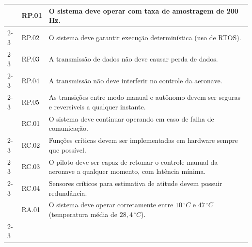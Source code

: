 \begin{table}[H]
{\begin{tabular}{|l|l|l|}
                                                                 & RP.01                                                               & O sistema deve operar com taxa de amostragem  de 200 Hz.                \\ \cline{2-3} 
                                                                 & RP.02                                                               & O sistema deve garantir execução determinística (uso de RTOS).                \\ \cline{2-3} 
                                                                 & RP.03                                                               & A transmissão de dados não deve causar perda de dados.                        \\ \cline{2-3} 
                                                                 & RP.04                                                               & A transmissão não deve interferir no controle da aeronave.                    \\ \cline{2-3}
\multirow{-5}{*}{Performance}                                    & RP.05                                                               & As transições entre modo manual e autônomo devem ser seguras e reversíveis a qualquer instante. \\ \hline
                                                                 & RC.01                                                               & O sistema deve continuar operando em caso de falha de comunicação.            \\ \cline{2-3} 
                                                                 & RC.02                                                               & Funções críticas devem ser implementadas em hardware sempre que possível.     \\ \cline{2-3}
                                                                 & RC.03                                                               & O piloto deve ser capaz de retomar o controle manual da aeronave a qualquer momento, com latência mínima. \\ \cline{2-3}
\multirow{-4}{*}{Confiabilidade}                                 & RC.04                                                               & Sensores críticos para estimativa de atitude devem possuir redundância. \\ \hline
                                                                 & RA.01                                                               & O sistema deve operar corretamente entre $10\,^\circ C$ e $47\,^\circ C$ (temperatura média de $28,4\,^\circ C$). \\ \cline{2-3}

\end{tabular}}
\end{table}
